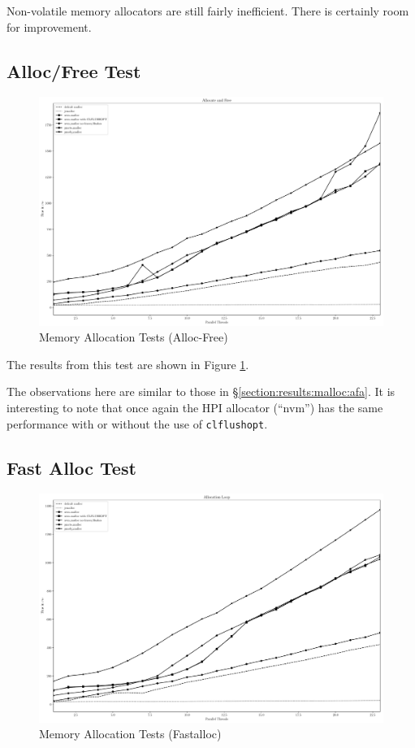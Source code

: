 Non-volatile memory allocators are still fairly inefficient.  There is certainly room for improvement.

\subsection{Alloc/Free Test}\label{section:results:malloc:af}

\begin{figure}
    \centering
    \caption{Memory Allocation Tests (Alloc-Free)}\label{plot:af}
    \includegraphics[scale=0.35]{malloc/alloc_free.pdf}
\end{figure}

The results from this test are shown in Figure \ref{plot:af}.

The observations here are similar to those in \S \ref{section:results:malloc:afa}.  It is interesting to note that once again the HPI allocator (``nvm'') has the same performance with or without the use of \texttt{clflushopt}.

\subsection{Fast Alloc Test}\label{section:results:malloc:fa}

\begin{figure}
    \centering
    \caption{Memory Allocation Tests (Fastalloc)}\label{plot:fastalloc}
    \includegraphics[scale=0.35]{malloc/fastalloc.pdf}
\end{figure}

